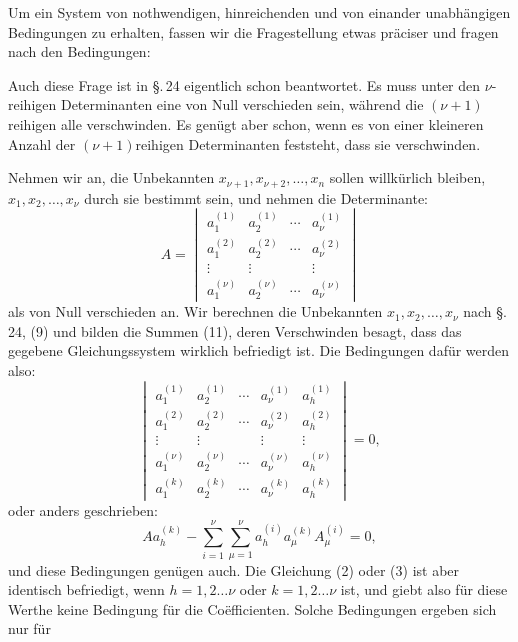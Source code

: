 
Um ein System von nothwendigen, hinreichenden und von einander unabhängigen Bedingungen zu erhalten, fassen wir die Fragestellung etwas präciser und fragen nach den Bedingungen:


Auch diese Frage ist in \S.\,24 eigentlich schon beantwortet. Es muss unter den $\nu$-reihigen Determinanten eine von Null verschieden sein, während die $(\nu+1)$reihigen alle verschwinden. Es genügt aber schon, wenn es von einer kleineren Anzahl der $(\nu+1)$reihigen Determinanten feststeht, dass sie verschwinden.

Nehmen wir an, die Unbekannten $x_{\nu+1},x_{\nu+2},\ldots,x_n$ sollen willkürlich bleiben, $x_1,x_2,\ldots,x_\nu$ durch sie bestimmt sein, und nehmen die Determinante:
\begin{equation}
 A=\begin{vmatrix}
 a_1^{(1)}&a_2^{(1)}&\cdots&a_\nu^{(1)}\\
 a_1^{(2)}&a_2^{(2)}&\cdots&a_\nu^{(2)}\\
 \vdots&\vdots&&\vdots\\
 a_1^{(\nu)}&a_2^{(\nu)}&\cdots&a_\nu^{(\nu)}
 \end{vmatrix}
\tag{1}
\end{equation}
als von Null verschieden an. Wir berechnen die Unbekannten $x_1,x_2,\ldots,x_\nu$ nach \S.\,24, (9) und bilden die Summen (11), deren Verschwinden besagt, dass das gegebene Gleichungssystem wirklich befriedigt ist. Die Bedingungen dafür werden also:
\begin{equation}
\begin{vmatrix}
 a_1^{(1)}&a_2^{(1)}&\cdots&a_\nu^{(1)}&a_h^{(1)}\\
 a_1^{(2)}&a_2^{(2)}&\cdots&a_\nu^{(2)}&a_h^{(2)}\\
 \vdots&\vdots&&\vdots&\vdots\\
 a_1^{(\nu)}&a_2^{(\nu)}&\cdots&a_\nu^{(\nu)}&a_h^{(\nu)}\\
 a_1^{(k)}&a_2^{(k)}&\cdots&a_\nu^{(k)}&a_h^{(k)}
\end{vmatrix}=0,
\tag{2}
\end{equation}
oder anders geschrieben:
\begin{equation}
 Aa_h^{(k)}-\sum_{i=1}^{\nu}\sum_{\mu=1}^{\nu}
 a_h^{(i)}a_\mu^{(k)}A_\mu^{(i)}=0,
\tag{3}
\end{equation}
und diese Bedingungen genügen auch. Die Gleichung (2) oder (3) ist aber identisch befriedigt, wenn $h=1,2\ldots\nu$ oder $k=1,2\ldots\nu$ ist, und giebt also für diese Werthe keine Bedingung für die Coëfficienten. Solche Bedingungen ergeben sich nur für
